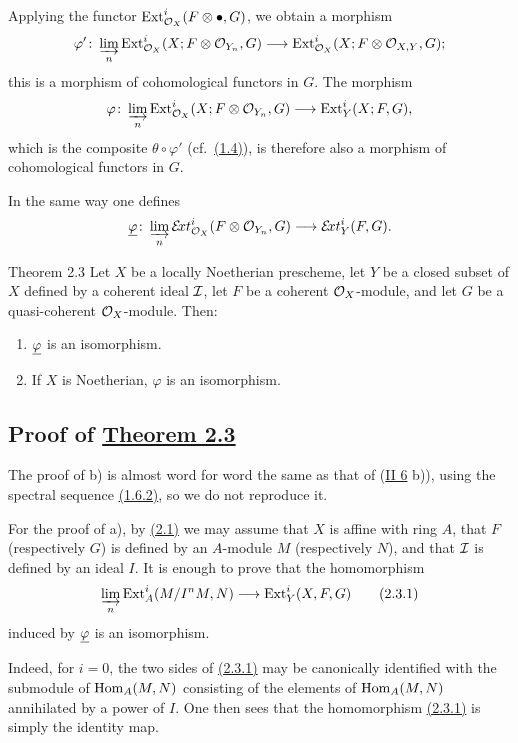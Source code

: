 Applying the functor $\operatorname{Ext}_{\mathcal O_X}^{i}(F\otimes\mathord\bullet,G)$, we obtain a
morphism
\[
 \varphi'\colon
 \varinjlim_n \operatorname{Ext}_{\mathcal O_X}^{i}(X;F\otimes\mathcal O_{Y_{n}},G)
 \longrightarrow \operatorname{Ext}_{\mathcal O_X}^{i}(X;F\otimes\mathcal O_{X,Y},G);
\]
this is a morphism of cohomological functors in $G$. The morphism
\[
 \varphi\colon
 \varinjlim_n \operatorname{Ext}_{\mathcal O_X}^{i}(X;F\otimes\mathcal O_{Y_{n}},G)
 \longrightarrow \operatorname{Ext}_Y^{i}(X;F,G),
\]
which is the composite $\theta\circ\varphi'$ (cf.~\hyperref[VI.1.4]{(1.4)}), is therefore also a
morphism of cohomological functors in $G$.

In the same way one defines
\[
 \underline{\varphi}\colon
 \varinjlim_n \mathcal E\!xt_{\mathcal O_X}^{i}(F\otimes\mathcal O_{Y_{n}},G)
 \longrightarrow \mathcal E\!xt_Y^{i}(F,G).
\]

\begin{sgastatement}{Theorem 2.3}
Let $X$ be a locally Noetherian prescheme, let $Y$ be a closed subset of $X$
defined by a coherent ideal $\mathcal I$, let $F$ be a coherent $\mathcal O_X$-module,
and let $G$ be a quasi-coherent $\mathcal O_X$-module. Then:
\begin{enumerate}
 \renewcommand{\labelenumi}{\alph{enumi})}
 \item $\underline{\varphi}$ is an isomorphism.
 \item If $X$ is Noetherian, $\varphi$ is an isomorphism.
\end{enumerate}
\end{sgastatement}

\subsection*{Proof of \hyperref[VI.2.3]{Theorem 2.3}}
The proof of b) is almost word for word the same as that of
\textup{(\hyperref[II.6]{II 6} b))}, using the spectral sequence \hyperref[VI.1.6.2]{(1.6.2)}, so we do not reproduce
it.

For the proof of a), by \hyperref[VI.2.1]{(2.1)} we may assume that $X$ is affine with ring $A$,
that $F$ (respectively $G$) is defined by an $A$-module $M$ (respectively
$N$), and that $\mathcal I$ is defined by an ideal $I$. It is enough to prove
that the homomorphism
\begin{equation}
 \varinjlim_n \operatorname{Ext}_A^i(M/I^nM,N)
 \longrightarrow \operatorname{Ext}_Y^i(X,F,G)
 \tag{2.3.1}\label{VI.2.3.1}
\end{equation}
induced by $\underline{\varphi}$ is an isomorphism.

Indeed, for $i=0$, the two sides of \hyperref[VI.2.3.1]{(2.3.1)} may be canonically identified with
the submodule of $\operatorname{Hom}_A(M,N)$ consisting of the elements of
$\operatorname{Hom}_A(M,N)$ annihilated by a power of $I$. One then sees that the
homomorphism \hyperref[VI.2.3.1]{(2.3.1)} is simply the identity map.

